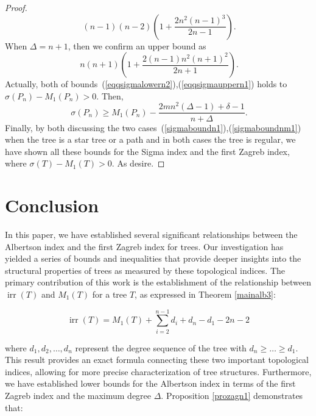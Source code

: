 \documentclass[12pt]{amsart}
\newcommand{\irr}{\operatorname{irr}}
\begin{document}
\begin{proof}
\begin{equation}~\label{eqqsigmalowern2}
   (n-1)(n-2)\left( 1 + \frac{2 n^{2} (n - 1)^{3}}{2 n - 1} \right).
\end{equation}
When $\Delta=n+1$, then we confirm an upper bound as
\begin{equation}~\label{eqqsigmauppern1}
   n (n + 1) \left( 1 + \frac{2 (n - 1) n^{2} (n + 1)^{2}}{2 n + 1} \right). 
\end{equation}
Actually, both of bounds~(\ref{eqqsigmalowern2}),(\ref{eqqsigmauppern1}) holds to $\sigma(P_n)-M_1(P_n)>0$. Then, 
\begin{equation}~\label{sigmaboundnm1}
     \sigma(P_n) \geq M_1(P_n)  - \frac{2mn^2(\Delta - 1)+\delta-1}{n+\Delta}.
\end{equation}
Finally, by both discussing the two cases~(\ref{sigmaboundn1}),(\ref{sigmaboundnm1}) when the tree is a star tree or a path and in both cases the tree is regular, we have shown all these bounds for the Sigma index and the first Zagreb index, where $\sigma(T)-M_1(T)>0$. As desire.
\end{proof}



\section{Conclusion}\label{sec5}
In this paper, we have established several significant relationships between the Albertson index and the first Zagreb index for trees. Our investigation has yielded a series of bounds and inequalities that provide deeper insights into the structural properties of trees as measured by these topological indices. The primary contribution of this work is the establishment of the relationship between $\irr(T)$ and $M_1(T)$ for a tree $T$, as expressed in Theorem \ref{mainalb3}:

\begin{equation}
\irr(T) = M_1(T) + \sum_{i=2}^{n-1} d_i + d_n - d_1 - 2n - 2
\end{equation}

\noindent where $d_1, d_2, \ldots, d_n$ represent the degree sequence of the tree with $d_n \geq \ldots \geq d_1$. This result provides an exact formula connecting these two important topological indices, allowing for more precise characterization of tree structures. Furthermore, we have established lower bounds for the Albertson index in terms of the first Zagreb index and the maximum degree $\Delta$. Proposition \ref{prozagn1} demonstrates that:
\end{document}
